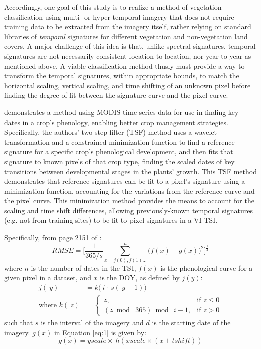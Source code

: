 Accordingly, one goal of this study is to realize a method of vegetation classification using multi- or hyper-temporal imagery that does not require training data to be extracted from the imagery itself, rather relying on standard libraries of \textit{temporal} signatures for different vegetation and non-vegetation land covers. A major challenge of this idea is that, unlike spectral signatures, temporal signatures are not necessarily consistent location to location, nor year to year as mentioned above. A viable classification method thusly must provide a way to transform the temporal signatures, within appropriate bounds, to match the horizontal scaling, vertical scaling, and time shifting of an unknown pixel before finding the degree of fit between the signature curve and the pixel curve.

\textcites{sakamoto2005a-crop}{sakamoto2010a-two-step} demonstrates a method using MODIS time-series data for use in finding key dates in a crop’s phenology, enabling better crop management strategies. Specifically, the authors’ two-step filter (TSF) method uses a wavelet transformation and a constrained minimization function to find a reference signature for a specific crop’s phenological development, and then fits that signature to known pixels of that crop type, finding the scaled dates of key transitions between developmental stages in the plants’ growth. This TSF method demonstrates that reference signatures can be fit to a pixel’s signature using a minimization function, accounting for the variations from the reference curve and the pixel curve.  This minimization method provides the means to account for the scaling and time shift differences, allowing previously-known temporal signatures (e.g. not from training sites) to be fit to pixel signatures in a VI TSI.

Specifically, from page 2151 of \textcite{sakamoto2010a-two-step}:
\begin{equation}
\label{eq:1}
  RMSE = \biggl[\frac{1}{365/s}\sum_{x=j(0), j(1)…}^{n}\bigl(f\left(x\right)-g\left(x\right)\bigr)^{2}\biggr]^{\frac{1}{2}}
\end{equation}
where $n$ is the number of dates in the TSI, $f(x)$ is the phenological curve for a given pixel in a dataset, and $x$ is the DOY, as defined by $j(y)$:
\begin{subequations}
\label{eq:DOYcalc}
  \begin{align}
    j\left(~y\right) &= k\bigl(~i\cdot~s\left(~y - 1\right)\bigr) \label{eq:jofy}\\
    \text{where\ \ \ \ } k\left(~z\right) &=
    \begin{cases}
      z, & \mbox{if } z \leq 0\\
      \left(z\bmod~365\right)\bmod~i-1, & \mbox{if } z > 0
    \end{cases} \label{eq:kofz}
  \end{align}
\end{subequations}
such that $s$ is the interval of the imagery and $d$ is the starting date of the imagery. $g(x)$ in Equation \ref{eq:1} is given by:
\begin{equation}
\label{eq:gofx}
  g(x) = yscale\times~h\left(xscale\times(x + tshift)\right)
\end{equation}

